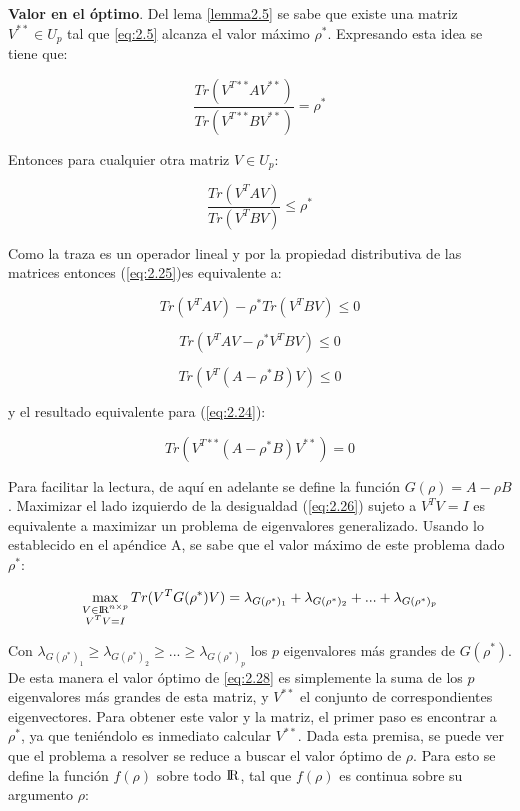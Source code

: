 \textbf{Valor en el óptimo}. Del lema \ref{lemma2.5} se sabe que existe una matriz $V^{**} \in U_p$ tal que \ref{eq:2.5} alcanza el valor máximo $\rho^*$. Expresando esta idea se tiene que:

\begin{equation} \label{eq:2.24}
 \frac{Tr(V^{T**} A V^{**})}{Tr(V^{T**} B V^{**})} = \rho^* 
\end{equation}

Entonces para cualquier otra matriz $V \in U_p $:

\begin{equation}\label{eq:2.25}
 \frac{Tr(V^T A V)}{Tr(V^T B V)} \leq \rho^* 
\end{equation}

Como la traza es un operador lineal y por la propiedad distributiva de las matrices entonces (\ref{eq:2.25})es equivalente a:

\begin{equation*}
 Tr(V^T A V)- \rho^* Tr(V^T B V) \leq 0 
\end{equation*}

\begin{equation*}
	Tr(V^T A V- \rho^* V^T B V) \leq 0	
 \end{equation*}

 \begin{equation} \label{eq:2.26}
	Tr(V^T (A - \rho^* B )V) \leq 0	
 \end{equation}

y el resultado equivalente para (\ref{eq:2.24}):
	
 \begin{equation} \label{eq:2.27}
	Tr(V^{T**} (A - \rho^* B )V^{**}) = 0	
 \end{equation}


Para facilitar la lectura, de aquí en adelante se define la función $G(\rho) = A- \rho B$. Maximizar el lado izquierdo de la desigualdad (\ref{eq:2.26}) sujeto a $V^T V = I$ es equivalente a maximizar un problema de eigenvalores generalizado. Usando lo establecido en el apéndice A, se sabe que el valor máximo de este problema dado $\rho^*$:

\begin{equation}\label{eq:2.28}
	\max_{\substack{V \in {\rm I\!R}^{n \times p} \\ V^T V = I}} Tr(V^T G(\rho^*) V) = \lambda_{G(\rho^*)_1} + \lambda_{G(\rho^*)_2} + ... + \lambda_{G(\rho^*)_p}
\end{equation}
  
 Con $\lambda_{G(\rho^*)_1} \geq \lambda_{G(\rho^*)_2} \geq ... \geq \lambda_{G(\rho^*)_p}$ los $p$ eigenvalores más grandes de $G(\rho^*)$. De esta manera el valor óptimo de \ref{eq:2.28} es simplemente la suma de los $p$ eigenvalores más grandes de esta matriz, y $V^{**}$ el conjunto de correspondientes eigenvectores. Para obtener este valor y la matriz, el primer paso es encontrar a $\rho^*$, ya que teniéndolo es inmediato calcular $V^{**}$. Dada esta premisa, se puede ver que el problema a resolver se reduce a buscar el valor óptimo de $\rho$. Para esto se define la función $f(\rho)$ sobre todo $\rm I\!R$, tal que $f(\rho)$ es continua sobre su argumento $\rho$: 

